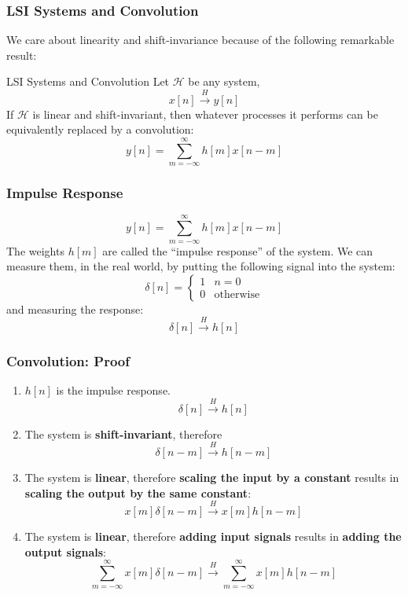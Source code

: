 \documentclass{beamer}
\begin{document}
\begin{frame}
  \frametitle{LSI Systems and Convolution}

  We care about linearity and shift-invariance because of the
  following remarkable result:
  \begin{block}{LSI Systems and Convolution}
    Let ${\mathcal H}$ be any system,
    \[
    x[n]\stackrel{H}{\longrightarrow} y[n]
    \]
    If ${\mathcal H}$ is linear and shift-invariant, then whatever
    processes it performs can be equivalently replaced by a
    convolution:
    \[
    y[n] = \sum_{m=-\infty}^\infty h[m] x[n-m]
    \]
  \end{block}
\end{frame}

\begin{frame}
  \frametitle{Impulse Response}

  \[
  y[n] = \sum_{m=-\infty}^\infty h[m] x[n-m]
  \]
  The weights $h[m]$ are called the ``impulse response'' of the
  system.  We can measure them, in the real world, by putting the
  following signal into the system:
  \[
  \delta[n] = \begin{cases} 1 & n=0\\ 0 & \mbox{otherwise}
  \end{cases}
  \]
  and measuring the response:
  \[
  \delta[n] \stackrel{H}{\longrightarrow} h[n]
  \]
\end{frame}



\begin{frame}
  \frametitle{Convolution: Proof}
  \begin{enumerate}
  \item $h[n]$ is the impulse response.
    \[
    \delta[n] \stackrel{H}{\longrightarrow} h[n]
    \]
  \item The system is {\bf shift-invariant}, therefore
    \[
    \delta[n-m] \stackrel{H}{\longrightarrow} h[n-m]
    \]
  \item The system is {\bf linear}, therefore {\bf scaling the input
    by a constant} results in {\bf scaling the output by the same
    constant}:
    \[
    x[m]\delta[n-m] \stackrel{H}{\longrightarrow} x[m]h[n-m]
    \]
  \item The system is {\bf linear}, therefore {\bf adding input
    signals} results in {\bf adding the output signals}:
    \[
    \sum_{m=-\infty}^\infty x[m]\delta[n-m]
    \stackrel{H}{\longrightarrow} \sum_{m=-\infty}^\infty x[m]h[n-m]
    \]
  \end{enumerate}
\end{frame}
\end{document}
